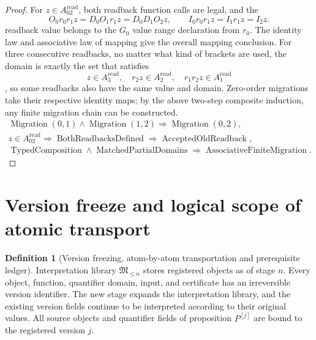 \documentclass[12pt,a4paper,openany,notitlepage]{report}
\theoremstyle{plain}
\theoremstyle{definition}
\newtheorem{definition}[theorem]{Definition}
\theoremstyle{remark}
\def\mathcal#1{#1}\def\mathsf#1{#1}\def\mathbb#1{#1}%
\begin{document}
\begin{CJK*}
\begin{proof}
For $z\in\mathcal A_{02}^{\mathrm{read}}$, both readback function calls are legal, and the \[
 O_0r_0r_1z=D_0O_1r_1z=D_0D_1O_2z,
 \qquad I_0r_0r_1z=I_1r_1z=I_2z.
\] readback value belongs to the $G_0$ value range declaration from $r_0$. The identity law and associative law of mapping give the overall mapping conclusion. For three consecutive readbacks, no matter what kind of brackets are used, the domain is exactly the set that satisfies \[
 z\in\mathcal A_3^{\mathrm{read}},\quad
 r_2z\in\mathcal A_2^{\mathrm{read}},\quad
 r_1r_2z\in\mathcal A_1^{\mathrm{read}}
\], so some readbacks also have the same value and domain. Zero-order migrations take their respective identity maps; by the above two-step composite induction, any finite migration chain can be constructed. \[
\begin{gathered}
 \operatorname{Migration}(0,1)\land\operatorname{Migration}(1,2)
 \Rightarrow\operatorname{Migration}(0,2),\\
 z\in\mathcal A_{02}^{\mathrm{read}}
 \Rightarrow\operatorname{BothReadbacksDefined}
 \Rightarrow\operatorname{AcceptedOldReadback},\\
 \operatorname{TypedComposition}\land\operatorname{MatchedPartialDomains}
 \Rightarrow\operatorname{AssociativeFiniteMigration}.
\end{gathered}
\]\end{proof}


\section { Version freeze and logical scope of atomic transport }\label{exp:gov:version-atoms-section}


\begin{definition}
[Version freezing, atom-by-atom transportation and prerequisite ledger]\label{hgov:def:certificate-transport}
Interpretation library $\mathfrak M_{\le n}$ stores registered objects as of stage $n$. Every object, function, quantifier domain, input, and certificate has an irreversible version identifier. The new stage expands the interpretation library, and the existing version fields continue to be interpreted according to their original values. All source objects and quantifier fields of proposition $P^{[j]}$ are bound to the registered version $j$.


\end{definition}
\end{CJK*}
\end{document}
